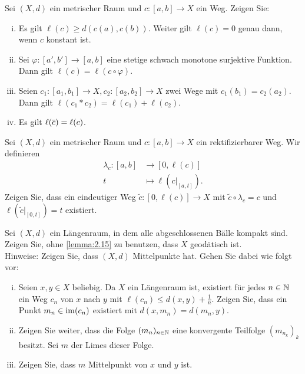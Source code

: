 	\begin{aufgabe}
		\label{aufg:4.2}	
		Sei $(X,d)$ ein metrischer Raum und $c \colon [a,b] \rightarrow X$ ein Weg.
		Zeigen Sie:
		\begin{enumerate}[(i)]
			\item Es gilt $\ell(c) \geq d(c(a),c(b))$.
			Weiter gilt $\ell(c) = 0$ genau dann, wenn $c$ konstant ist.
			\item Sei $\varphi\colon [a',b'] \rightarrow [a,b]$ eine stetige schwach monotone surjektive Funktion.
			Dann gilt $\ell(c) = \ell(c \circ \varphi)$.
			\item Seien $c_1\colon [a_1,b_1] \rightarrow X, c_2\colon [a_2,b_2] \rightarrow X$ zwei Wege mit $c_1(b_1) = c_2(a_2)$.
			Dann gilt $\ell(c_1 * c_2) = \ell(c_1) + \ell(c_2)$.
			\item Es gilt $\ell(\overline{c}) = \ell(c)$.
		\end{enumerate}
	\end{aufgabe}
	
	\begin{aufgabe}
		\label{aufg:4.3}	
		Sei $(X,d)$ ein metrischer Raum und $c \colon [a,b] \rightarrow X$ ein rektifizierbarer Weg.
		Wir definieren
		\begin{align*}
			\lambda_c \colon [a,b] &\longrightarrow [0,\ell(c)] \\
			t &\longmapsto \ell(c \big|_{[a,t]}).
		\end{align*}
		Zeigen Sie, dass ein eindeutiger Weg $\tilde{c}\colon [0,\ell(c)] \rightarrow X$ mit $\tilde{c} \circ \lambda_c = c$ und $\ell(\tilde{c}\big|_{[0,t]}) = t$ existiert.
	\end{aufgabe}
	
	\begin{aufgabe}
		\label{aufg:4.4}	
		Sei $(X,d)$ ein Längenraum, in dem alle abgeschlossenen Bälle kompakt sind.
		Zeigen Sie, ohne \autoref{lemma:2.15} zu benutzen, dass $X$ geodätisch ist. \\
		Hinweise: Zeigen Sie, dass $(X,d)$ Mittelpunkte hat.
		Gehen Sie dabei wie folgt vor:
		\begin{enumerate}[(i)]
			\item Seien $x,y \in X$ beliebig.
			Da $X$ ein Längenraum ist, existiert für jedes $n \in \mathbb{N}$ ein Weg $c_n$ von $x$ nach $y$ mit $\ell(c_n) \leq d(x,y) + \frac{1}{n}$.
			Zeigen Sie, dass ein Punkt $m_n \in \operatorname{im}(c_n)$ existiert mit $d(x,m_n) = d(m_n,y)$.
			\item Zeigen Sie weiter, dass die Folge $(m_n)_{n \in \mathbb{N}}$ eine konvergente Teilfolge $(m_{n_k})_k$ besitzt.
			Sei $m$ der Limes dieser Folge.
			\item Zeigen Sie, dass $m$ Mittelpunkt von $x$ und $y$ ist.
		\end{enumerate}
	\end{aufgabe}
	
